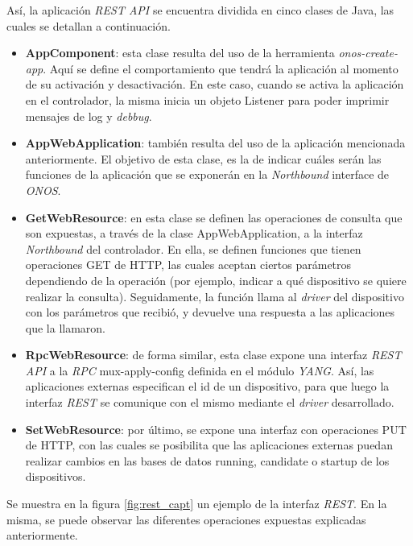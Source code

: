   Así, la aplicación \textit{REST API} se encuentra dividida en cinco clases de Java, las cuales se detallan a continuación. 


  \begin{itemize}
	\item \textbf{AppComponent}: esta clase resulta del uso de la herramienta \textit{onos-create-app}. Aquí se define el comportamiento que tendrá la aplicación al momento de su activación y desactivación. En este caso, cuando se activa la aplicación en el controlador, la misma inicia un objeto Listener para poder imprimir mensajes de log y \textit{debbug}.
    
    \item \textbf{AppWebApplication}: también resulta del uso de la aplicación mencionada anteriormente. El objetivo de esta clase, es la de indicar cuáles serán las funciones de la aplicación que se exponerán en la \textit{Northbound} interface de \textit{ONOS}.

    \item \textbf{GetWebResource}: en esta clase se definen las operaciones de consulta que son expuestas, a través de la clase AppWebApplication, a la interfaz \textit{Northbound} del controlador. En ella, se definen funciones que tienen operaciones GET de HTTP, las cuales aceptan ciertos parámetros dependiendo de la operación (por ejemplo, indicar a qué dispositivo se quiere realizar la consulta). Seguidamente, la función llama al \textit{driver} del dispositivo con los parámetros que recibió,  y devuelve una respuesta a las aplicaciones que la llamaron.
    
    \item \textbf{RpcWebResource}: de forma similar, esta clase expone una interfaz \textit{REST API} a la \textit{RPC} mux-apply-config definida en el módulo \textit{YANG}. Así, las aplicaciones externas especifican el id de un dispositivo, para que luego la interfaz \textit{REST} se comunique con el mismo mediante el \textit{driver} desarrollado. 
    
    \item \textbf{SetWebResource}: por último, se expone una interfaz con operaciones PUT de HTTP, con las cuales se posibilita que las aplicaciones externas puedan realizar cambios en las bases de datos running, candidate o startup de los dispositivos.

\end{itemize}

Se muestra en la figura \ref{fig:rest_capt} un ejemplo de la interfaz \textit{REST}. En la misma, se puede observar las diferentes operaciones expuestas explicadas anteriormente.

